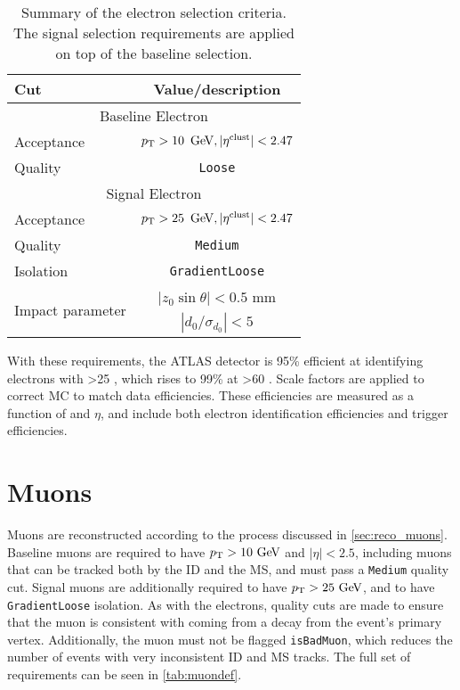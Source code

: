 \begin{table}[ph!]
\begin{center}
    \begin{tabular}{l|c}
      \hline
      Cut            & Value/description \\
      \hline
      \hline
      \multicolumn{2}{c}{Baseline Electron}\\
      \hline
      Acceptance   & $\pt > 10\,\GeV, |\eta^\mathrm{clust}| < 2.47$ \\
      Quality      & \texttt{Loose} \\
      \hline
      \multicolumn{2}{c}{Signal Electron}\\
      \hline
      Acceptance   & $\pt > 25\,\GeV, |\eta^\mathrm{clust}| < 2.47$ \\
      Quality          & \texttt{Medium} \\
      Isolation        & \texttt{GradientLoose} \\
      \multirow{2}{*}{Impact parameter} & $|z_0 \sin\theta|< 0.5$ mm \\
                       & $|d_0/\sigma_{d_0}|< 5$ \\ 
      \hline
      \hline
\end{tabular}
\end{center}
\caption{Summary of the electron selection criteria. The signal selection requirements are applied on top of the baseline selection.
  }              
\label{tab:eledef}
\end{table}

With these requirements, the \ac{ATLAS} detector is 95\% efficient at identifying electrons with \pt>25 \gev, which rises to 99\% at \pt>60 \gev \cite{ATLAS-CONF-2014-032}. Scale factors are applied to correct \ac{MC} to match data efficiencies. These efficiencies are measured as a function of \pt and $\eta$, and include both electron identification efficiencies and trigger efficiencies. 

\section{Muons}

Muons are reconstructed according to the process discussed in \autoref{sec:reco_muons}. Baseline muons are required to have $\pt>10\gev$ and $|\eta|<2.5$, including muons that can be tracked both by the \ac{ID} and the \ac{MS}, and must pass a \texttt{Medium} quality cut. Signal muons are additionally required to have $\pt>25\gev$, and to have \texttt{GradientLoose} isolation. As with the electrons, quality cuts are made to ensure that the muon is consistent with coming from a decay from the event's primary vertex. Additionally, the muon must not be flagged \texttt{isBadMuon}, which reduces the number of events with very inconsistent \ac{ID} and \ac{MS} tracks. The full set of requirements can be seen in \autoref{tab:muondef}.

